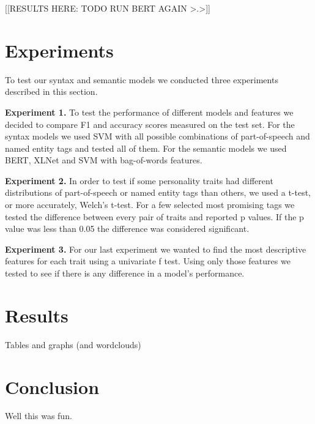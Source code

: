 \documentclass[10pt, a4paper]{article}
\begin{document}
[[RESULTS HERE: TODO RUN BERT AGAIN >.>]]

\section{Experiments}
To test our syntax and semantic models we conducted three experiments described in this section.

\textbf{Experiment 1.} To test the performance of different models and features we decided to compare F1 and accuracy scores measured on the test set.
For the syntax models we used SVM with all possible combinations of part-of-speech and named entity tags and tested all of them.
For the semantic models we used BERT, XLNet and SVM with bag-of-words features.

\textbf{Experiment 2.}  In order to test if some personality traits had different distributions of part-of-speech or named entity tags than others, we used a t-test, or more accurately, Welch’s t-test.
For a few selected most promising tags we tested the difference between every pair of traits and reported p values.
If the p value was less than 0.05 the difference was considered significant.

\textbf{Experiment 3.} For our last experiment we wanted to find the most descriptive features for each trait using a univariate f test.
Using only those features we tested to see if there is any difference in a model's performance.

\section{Results}
Tables and graphs (and wordclouds)

\section{Conclusion}
Well this was fun.



\end{document}
